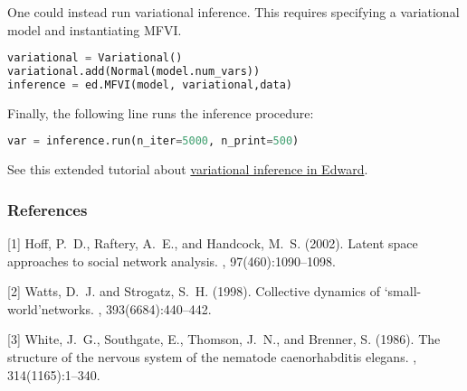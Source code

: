 One could instead run variational inference. This requires specifying a variational model and instantiating MFVI.
\begin{lstlisting}[language=Python]
variational = Variational()
variational.add(Normal(model.num_vars))
inference = ed.MFVI(model, variational,data)
\end{lstlisting}
Finally, the following line runs the inference procedure:
\begin{lstlisting}[language=Python]
var = inference.run(n_iter=5000, n_print=500)
\end{lstlisting}
See this extended tutorial about
\href{tut_KLqp.html}{variational inference in Edward}.

\subsubsection{References}
\begin{thebibliography}{}
[1] Hoff, P.~D., Raftery, A.~E., and Handcock, M.~S. (2002).
\newblock Latent space approaches to social network analysis.
,
  97(460):1090--1098.

[2] Watts, D.~J. and Strogatz, S.~H. (1998).
\newblock Collective dynamics of ‘small-world’networks.
, 393(6684):440--442.

[3] White, J.~G., Southgate, E., Thomson, J.~N., and Brenner, S. (1986).
\newblock The structure of the nervous system of the nematode caenorhabditis
  elegans.
, 314(1165):1--340.
\end{thebibliography}

